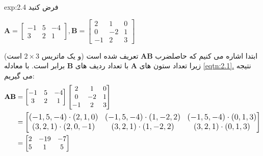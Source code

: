 {\begin{spacing}{1.5}
        \begin{example}{exp:2.4}
            \Large
            فرض کنید

            \begin{center}
                $\textbf{A}=\begin{bmatrix}
                                -1 & 5 & -4 \\
                                3  & 2 & 1
                \end{bmatrix}, \textbf{B}=\begin{bmatrix}
                                              2  & 1  & 0 \\
                                              0  & -2 & 1 \\
                                              -1 & 2  & 3
                \end{bmatrix}$
            \end{center}

            ابتدا اشاره می کنیم که حاصلضرب $\textbf{AB}$ تعریف شده است (و یک ماتریس $2\times 3$ است) زیرا تعداد ستون های $\textbf{A}$ با تعداد ردیف های $\textbf{B}$ برابر است. با معادله \hyperref[eqtn:2.1]{\ref{eqtn:2.1}.} نتیجه می گیریم:
            \begin{equation*}
                \centering
                \begin{split}
                    \textbf{AB}&=\begin{bmatrix}
                                     -1 & 5 & -4 \\
                                     3  & 2 & 1
                    \end{bmatrix}\begin{bmatrix}
                                     2  & 1  & 0 \\
                                     0  & -2 & 1 \\
                                     -1 & 2  & 3
                    \end{bmatrix}\\
                    &={\large\begin{bmatrix}
                    (-1,5,-4)
                                 \cdot(2,1,0)         & (-1,5,-4)\cdot(1,-2,2) & (-1,5,-4)\cdot(0,1,3) \\
                                 (3,2,1)\cdot(2,0,-1) & (3,2,1)\cdot(1,-2,2)   & (3,2,1)\cdot(0,1,3)
                    \end{bmatrix}}\\
                    &=\begin{bmatrix}
                          2 & -19 & -7 \\
                          5 & 1   & 5
                    \end{bmatrix}
                \end{split}
            \end{equation*}


\end{example}
\end{spacing}}
